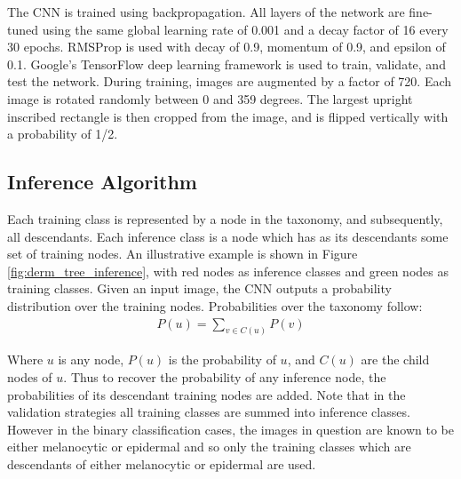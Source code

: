 The CNN is trained using backpropagation. All layers of the network are fine-tuned using the same global learning rate of 0.001 and a decay factor of 16 every 30 epochs. RMSProp is used with decay of 0.9, momentum of 0.9, and epsilon of 0.1. Google’s TensorFlow \cite{abadi2016tensorflow} deep learning framework is used to train, validate, and test the network. During training, images are augmented by a factor of 720. Each image is rotated randomly between 0 and 359 degrees. The largest upright inscribed rectangle is then cropped from the image, and is flipped vertically with a probability of 1/2. 

\subsection{Inference Algorithm}
Each training class is represented by a node in the taxonomy, and subsequently, all descendants. Each inference class is a node which has as its descendants some set of training nodes. An illustrative example is shown in Figure \ref{fig:derm_tree_inference}, with red nodes as inference classes and green nodes as training classes. Given an input image, the CNN outputs a probability distribution over the training nodes. Probabilities over the taxonomy follow:
\begin{gather}
    P(u) = \sum_{v \in C(u)} P(v)
\end{gather}

Where $u$ is any node, $P(u)$ is the probability of $u$, and $C(u)$ are the child nodes of $u$. Thus to recover the probability of any inference node, the probabilities of its descendant training nodes are added. Note that in the validation strategies all training classes are summed into inference classes. However in the binary classification cases, the images in question are known to be either melanocytic or epidermal and so only the training classes which are descendants of either melanocytic or epidermal are used.

